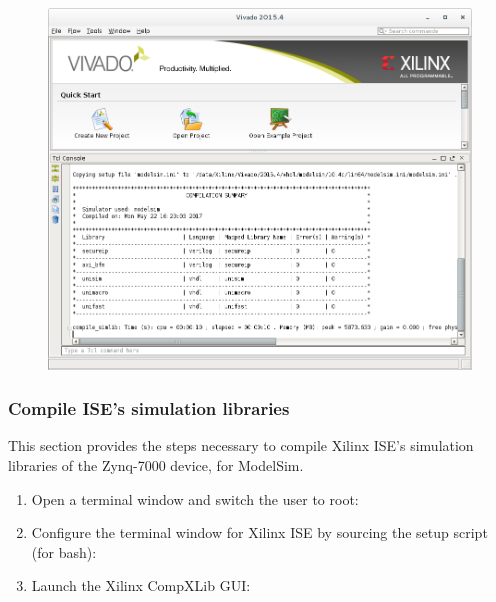 \begin{flushleft}
\begin{flushleft}
\begin{enumerate}
\begin{figure}[H]
	\end{figure}
	\begin{figure}[H]
	\centering\captionsetup{type=figure}\includegraphics[scale=0.5]{figures/xilinx_vivado_2015_compsimlib_out}
	\end{figure}
		\end{enumerate}
\end{flushleft}
\subsubsection{Compile ISE's simulation libraries}
	This section provides the steps necessary to compile Xilinx ISE's simulation libraries of the Zynq-7000 device, for ModelSim.

\begin{flushleft}
	\begin{enumerate}
	 	\item Open a terminal window and switch the user to root:
			\subitem {}
		\item Configure the terminal window for Xilinx ISE by sourcing the setup script (for bash):
			\subitem {}
			\subitem {}
		\item Launch the Xilinx CompXLib GUI:
			\subitem {}
			\subitem {}


\end{enumerate}
\end{flushleft}
\end{flushleft}
